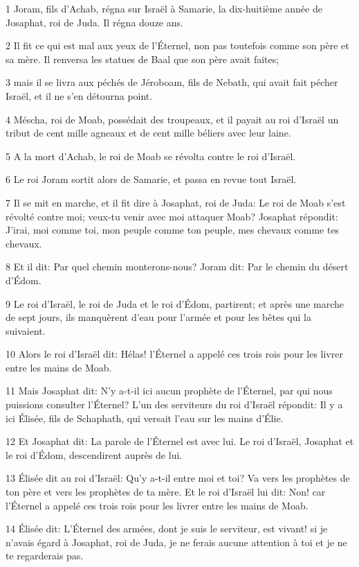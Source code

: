 \par 1 Joram, fils d'Achab, régna sur Israël à Samarie, la dix-huitième année de Josaphat, roi de Juda. Il régna douze ans.
\par 2 Il fit ce qui est mal aux yeux de l'Éternel, non pas toutefois comme son père et sa mère. Il renversa les statues de Baal que son père avait faites;
\par 3 mais il se livra aux péchés de Jéroboam, fils de Nebath, qui avait fait pécher Israël, et il ne s'en détourna point.
\par 4 Méscha, roi de Moab, possédait des troupeaux, et il payait au roi d'Israël un tribut de cent mille agneaux et de cent mille béliers avec leur laine.
\par 5 A la mort d'Achab, le roi de Moab se révolta contre le roi d'Israël.
\par 6 Le roi Joram sortit alors de Samarie, et passa en revue tout Israël.
\par 7 Il se mit en marche, et il fit dire à Josaphat, roi de Juda: Le roi de Moab s'est révolté contre moi; veux-tu venir avec moi attaquer Moab? Josaphat répondit: J'irai, moi comme toi, mon peuple comme ton peuple, mes chevaux comme tes chevaux.
\par 8 Et il dit: Par quel chemin monterons-nous? Joram dit: Par le chemin du désert d'Édom.
\par 9 Le roi d'Israël, le roi de Juda et le roi d'Édom, partirent; et après une marche de sept jours, ils manquèrent d'eau pour l'armée et pour les bêtes qui la suivaient.
\par 10 Alors le roi d'Israël dit: Hélas! l'Éternel a appelé ces trois rois pour les livrer entre les mains de Moab.
\par 11 Mais Josaphat dit: N'y a-t-il ici aucun prophète de l'Éternel, par qui nous puissions consulter l'Éternel? L'un des serviteurs du roi d'Israël répondit: Il y a ici Élisée, fils de Schaphath, qui versait l'eau sur les mains d'Élie.
\par 12 Et Josaphat dit: La parole de l'Éternel est avec lui. Le roi d'Israël, Josaphat et le roi d'Édom, descendirent auprès de lui.
\par 13 Élisée dit au roi d'Israël: Qu'y a-t-il entre moi et toi? Va vers les prophètes de ton père et vers les prophètes de ta mère. Et le roi d'Israël lui dit: Non! car l'Éternel a appelé ces trois rois pour les livrer entre les mains de Moab.
\par 14 Élisée dit: L'Éternel des armées, dont je suis le serviteur, est vivant! si je n'avais égard à Josaphat, roi de Juda, je ne ferais aucune attention à toi et je ne te regarderais pas.
